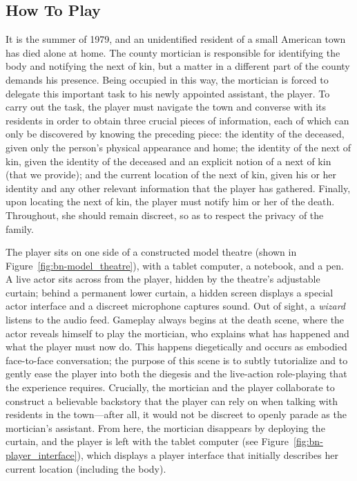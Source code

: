 \documentclass[letterpaper]{article}
\begin{document}
\subsection{How To Play}

It is the summer of 1979, and an unidentified resident of a small American town has died alone at home. The county mortician is responsible for identifying the body and notifying the next of kin, but a matter in a different part of the county demands his presence. Being occupied in this way, the mortician is forced to delegate this important task to his newly appointed assistant, the player. To carry out the task, the player must navigate the town and converse with its residents in order to obtain three crucial pieces of information, each of which can only be discovered by knowing the preceding piece: the identity of the deceased, given only the person's physical appearance and home; the identity of the next of kin, given the identity of the deceased and an explicit notion of a next of kin (that we provide); and the current location of the next of kin, given his or her identity and any other relevant information that the player has gathered. Finally, upon locating the next of kin, the player must notify him or her of the death. Throughout, she should remain discreet, so as to respect the privacy of the family.

The player sits on one side of a constructed model theatre (shown in Figure~\ref{fig:bn-model_theatre}), with a tablet computer, a notebook, and a pen. A live actor sits across from the player, hidden by the theatre's adjustable curtain; behind a permanent lower curtain, a hidden screen displays a special actor interface and a discreet microphone captures sound. Out of sight, a \textit{wizard} listens to the audio feed. Gameplay always begins at the death scene, where the actor reveals himself to play the mortician, who explains what has happened and what the player must now do. This happens diegetically and occurs as embodied face-to-face conversation; the purpose of this scene is to subtly tutorialize and to gently ease the player into both the diegesis and the live-action role-playing that the experience requires. Crucially, the mortician and the player collaborate to construct a believable backstory that the player can rely on when talking with residents in the town---after all, it would not be discreet to openly parade as the mortician's assistant. From here, the mortician disappears by deploying the curtain, and the player is left with the tablet computer (see Figure~\ref{fig:bn-player_interface}), which displays a player interface that initially describes her current location (including the body).
\end{document}
